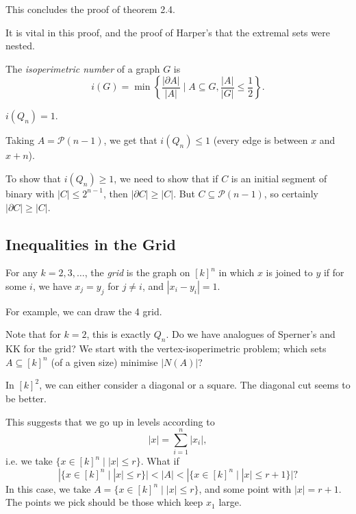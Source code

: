 \documentclass[12pt]{article}
\begin{document}
This concludes the proof of theorem 2.4.


\begin{remark}
	It is vital in this proof, and the proof of Harper's that the extremal sets were nested.
\end{remark}

The \emph{isoperimetric number} of a graph  $G$ is
\[
	i(G) = \min \left\{ \frac{|\partial A|}{|A|} \mid A \subseteq G, \frac{|A|}{|G|} \leq \frac{1}{2} \right\}.
\]

\begin{corollary}
	$i(Q_n) = 1$.
\end{corollary}

\begin{proofbox}
	Taking $A = \mathcal{P}(n-1)$, we get that $i(Q_n) \leq 1$ (every edge is between $x$ and $x + n$).

	To show that $i(Q_n) \geq 1$, we need to show that if $C$ is an initial segment of binary with $|C| \leq 2^{n-1}$, then $|\partial C| \geq |C|$. But $C \subseteq \mathcal{P}(n-1)$, so certainly $|\partial C| \geq |C|$.
\end{proofbox}

\subsection{Inequalities in the Grid}%
\label{sub:ineq_gid}

For any $k = 2, 3, \ldots$,  the \emph{grid} is the graph on $[k]^{n}$ in which $x$ is joined to $y$ if for some $i$, we have $x_j = y_j$ for $j \neq i$, and $|x_i - y_i| = 1$.

For example, we can draw the 4 grid.

Note that for $k = 2$, this is exactly $Q_n$. Do we have analogues of Sperner's and KK for the grid? We start with the vertex-isoperimetric problem; which sets $A \subseteq [k]^{n}$ (of a given size) minimise $|N(A)|$?

In $[k]^2$, we can either consider a diagonal or a square. The diagonal cut seems to be better.

This suggests that we go up in levels according to
\[
|x| = \sum_{i = 1}^n |x_i|,
\]
i.e. we take $\{x \in [k]^{n} \mid |x| \leq r\}$. What if
\[
|\{x \in [k]^{n} \mid |x| \leq r\}| < |A| < |\{x \in [k]^{n} \mid |x| \leq r+1\}|?
\]
In this case, we take $A = \{x \in [k]^{n} \mid |x| \leq r\}$, and some point with $|x| = r + 1$. The points we pick should be those which keep $x_1$ large.
\end{document}
